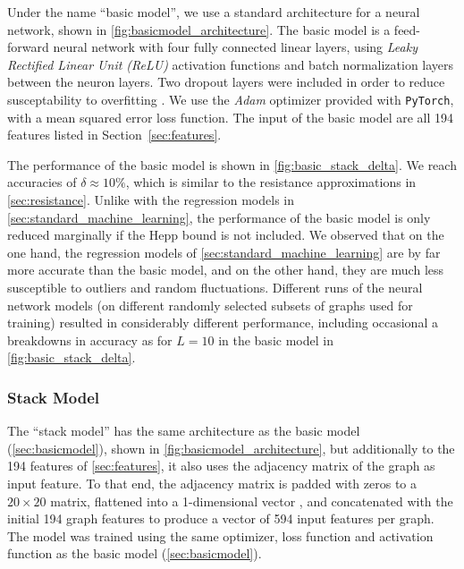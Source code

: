 \documentclass[12pt]{article}
\numberwithin{equation}{section}
\begin{document}
Under the name \enquote{basic model}, we use a standard architecture for a neural network, shown in \cref{fig:basicmodel_architecture}. The basic model is a feed-forward neural network with four fully connected linear layers, using \emph{Leaky Rectified Linear Unit (ReLU)} activation functions and batch normalization layers between the neuron layers. Two dropout layers were included in order to reduce susceptability to overfitting \cite{goodfellow_deep_2016}. We use the \emph{Adam} \cite{kingma_adam_2014} optimizer provided with \texttt{PyTorch}, with a mean squared error loss function. The input of the basic model are  all 194 features listed in Section~\ref{sec:features}.



The performance of the basic model is shown in \cref{fig:basic_stack_delta}. We reach accuracies of $\delta \approx 10\%$, which is similar to the resistance approximations in \cref{sec:resistance}. 
 Unlike with the regression models in \cref{sec:standard_machine_learning}, the performance of the basic model is only reduced marginally if the Hepp bound is not included. 
We observed that on the one hand, the regression models of \cref{sec:standard_machine_learning} are by far more accurate than the basic model, and on the other hand, they are much less susceptible to outliers and random fluctuations. Different runs of the neural network models (on different randomly selected subsets of graphs used for training) resulted in considerably different performance, including occasional a breakdowns in accuracy as for $L=10$ in the basic model in \cref{fig:basic_stack_delta}. 
 






\subsubsection{Stack Model}\label{sec:stackmodel}
The \enquote{stack model} has the same architecture as the basic model (\cref{sec:basicmodel}), shown in \cref{fig:basicmodel_architecture}, but additionally to the 194 features of \cref{sec:features}, it also  uses  the adjacency  matrix of the graph  as input feature. To that end, the adjacency matrix is padded with zeros to a $20\times 20$ matrix,  flattened into a 1-dimensional vector \cite{goyal_graph_2018}, and concatenated with the initial 194 graph features to produce a vector of 594 input features per graph. The model was trained using the same optimizer, loss function and activation function as the basic model (\cref{sec:basicmodel}).
\end{document}
